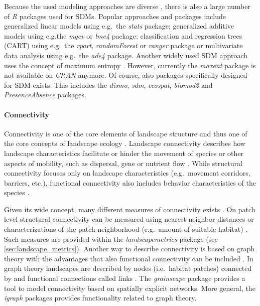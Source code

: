 \documentclass[smallextended]{svjour3}       %
\begin{document}
Because the used modeling approaches are diverse
\cite{Hooten2011,Kerr2011,Fletcher2019}, there is also a large number of
\emph{R} packages used for SDMs. Popular approaches and packages include
generalized linear models using e.g.~the \emph{stats} package;
generalized additive models using e.g.the \emph{mgcv} or \emph{lme4}
package; classification and regression trees (CART) using e.g.~the
\emph{rpart}, \emph{randomForest} or \emph{ranger} package or
multivariate data analysis using e.g.~the \emph{ade4} package. Another
widely used SDM approach uses the concept of maximum entropy
\cite{Phillips2006,Fletcher2019}. However, currently the \emph{maxent}
package is not available on \emph{CRAN} anymore. Of course, also
packages specifically designed for SDM exists. This includes the
\emph{dismo}, \emph{sdm}, \emph{ecospat}, \emph{biomod2} and
\emph{PresenceAbsence} packages.

\hypertarget{sec:connectivity}{%
\paragraph{Connectivity}\label{sec:connectivity}}

Connectivity is one of the core elements of landscape structure
\cite{Taylor1993} and thus one of the core concepts of landscape ecology
\cite{With2019}. Landscape connectivity describes how landscape
characteristics facilitate or hinder the movement of species
\cite{Tischendorf2000} or other aspects of mobility, such as dispersal,
gene or nutrient flow \cite{With2019}. While structural connectivity
focuses only on landscape characteristics (e.g.~movement corridors,
barriers, etc.), functional connectivity also includes behavior
characteristics of the species \cite{Tischendorf2000,With2019}.

Given its wide concept, many different measures of connectivity exists
\cite{Kindlmann2008}. On patch level structural connectivity can be
measured using nearest-neighbor distances or characterizations of the
patch neighborhood (e.g.~amount of suitable habitat)
\cite{Kindlmann2008,With2019}. Such measures are provided within the
\emph{landscapemetrics} package (see \ref{sec:landscape_metrics}).
Another way to describe connectivity is based on graph theory with the
advantages that also functional connectivity can be included
\cite{Kindlmann2008}. In graph theory \cite{Laita2011} landscapes are
described by nodes (i.e.~habitat patches) connected by and functional
connections called links \cite{Laita2011}. The \emph{grainscape} package
\cite{Chubaty2020} provides a tool to model connectivity based on
spatially explicit networks. More general, the \emph{igraph} packages
\cite{Csardi2006} provides functionality related to graph theory.
\end{document}
